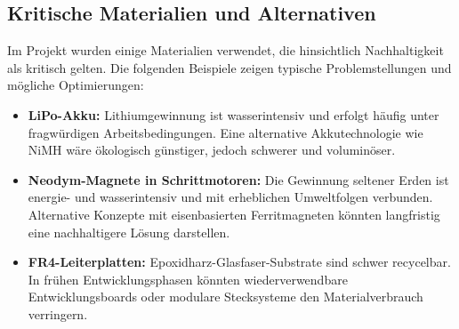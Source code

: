 \documentclass[main.tex]{subfiles} %
\begin{document}

\subsection{Kritische Materialien und Alternativen}

Im Projekt wurden einige Materialien verwendet, die hinsichtlich Nachhaltigkeit 
als kritisch gelten. Die folgenden Beispiele zeigen typische Problemstellungen 
und mögliche Optimierungen:

\begin{itemize}
    \item \textbf{LiPo-Akku:} 
    Lithiumgewinnung ist wasserintensiv und erfolgt häufig unter fragwürdigen 
    Arbeitsbedingungen. Eine alternative Akkutechnologie wie NiMH wäre ökologisch 
    günstiger, jedoch schwerer und voluminöser.
    
    \item \textbf{Neodym-Magnete in Schrittmotoren:} Die Gewinnung seltener Erden 
    ist energie- und wasserintensiv und mit erheblichen Umweltfolgen verbunden. 
    Alternative Konzepte mit eisenbasierten Ferritmagneten könnten langfristig 
    eine nachhaltigere Lösung darstellen.
    
    \item \textbf{FR4-Leiterplatten:} Epoxidharz-Glasfaser-Substrate sind schwer 
    recycelbar. In frühen Entwicklungsphasen könnten wiederverwendbare 
    Entwicklungsboards oder modulare Stecksysteme den Materialverbrauch verringern.
\end{itemize}
\end{document}
